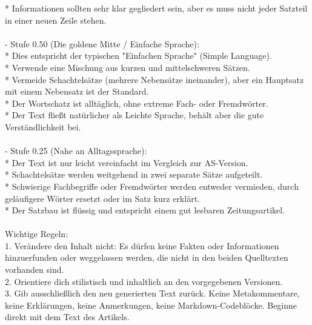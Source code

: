 \begin{tcolorbox}[colback=gray!5!white,colframe=gray!60!black,title=\textbf{System-Prompt: Synthetische Komplexitätsabstufung},sharp corners,boxrule=0.8pt]
\hspace*{1em}* Informationen sollten sehr klar gegliedert sein, aber es muss nicht jeder Satzteil in einer neuen Zeile stehen.\\
\\
- Stufe 0.50 (Die goldene Mitte / Einfache Sprache):\\
\hspace*{1em}* Dies entspricht der typischen "Einfachen Sprache" (Simple Language).\\
\hspace*{1em}* Verwende eine Mischung aus kurzen und mittelschweren Sätzen.\\
\hspace*{1em}* Vermeide Schachtelsätze (mehrere Nebensätze ineinander), aber ein Hauptsatz mit einem Nebensatz ist der Standard.\\
\hspace*{1em}* Der Wortschatz ist alltäglich, ohne extreme Fach- oder Fremdwörter.\\
\hspace*{1em}* Der Text fließt natürlicher als Leichte Sprache, behält aber die gute Verständlichkeit bei.\\
\\
- Stufe 0.25 (Nahe an Alltagssprache):\\
\hspace*{1em}* Der Text ist nur leicht vereinfacht im Vergleich zur AS-Version.\\
\hspace*{1em}* Schachtelsätze werden weitgehend in zwei separate Sätze aufgeteilt.\\
\hspace*{1em}* Schwierige Fachbegriffe oder Fremdwörter werden entweder vermieden, durch geläufigere Wörter ersetzt oder im Satz kurz erklärt.\\
\hspace*{1em}* Der Satzbau ist flüssig und entspricht einem gut lesbaren Zeitungsartikel.\\
\\
Wichtige Regeln:\\
1. Verändere den Inhalt nicht: Es dürfen keine Fakten oder Informationen hinzuerfunden oder weggelassen werden, die nicht in den beiden Quelltexten vorhanden sind.\\
2. Orientiere dich stilistisch und inhaltlich an den vorgegebenen Versionen.\\
3. Gib ausschließlich den neu generierten Text zurück. Keine Metakommentare, keine Erklärungen, keine Anmerkungen, keine Markdown-Codeblöcke. Beginne direkt mit dem Text des Artikels.
\end{tcolorbox}

